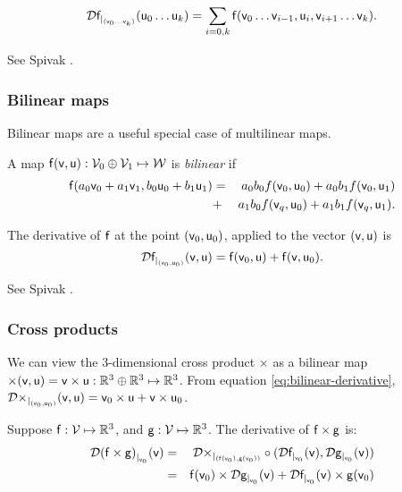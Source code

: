 \begin{equation}
\Dc{\f}{(\v_0 \ldots \v_k)}{\u_0 \ldots \u_k}
 =  \sum_{i=0,k} \f(\v_0 \ldots \v_{i-1},\u_i,\v_{i+1} \ldots \v_k).
\end{equation}

See Spivak \cite[ex.~2-14]{spivak-1965}.



\subsubsection{Bilinear maps}
\label{sec:Bilinear-maps}

Bilinear maps are a useful special case of multilinear maps.

A map $\f(\v,\u):\Vspace_0 \oplus \Vspace_1 \mapsto \Wspace$
is {\it bilinear} if
\begin{eqnarray}
\f(a_0 \v_0 + a_1 \v_1, b_0 \u_0 + b_1 \u_1)
& =  & a_0 b_0 f(\v_0,\u_0)
+  a_0 b_1 f(\v_0,\u_1)
\\
& +  & a_1 b_0 f(\v_q,\u_0)
 +  a_1 b_1 f(\v_q,\u_1).
\nonumber
\end{eqnarray}

The derivative of $\f$
at the point $(\v_0,\u_0)$, applied to the vector $(\v,\u)$ is
\begin{equation}
\label{eq:bilinear-derivative}
\Dc{\f}{(\v_0,\u_0)}{\v,\u} = \f(\v_0,\u) + \f(\v,\u_0).
\end{equation}

See Spivak \cite[ex.~2-12]{spivak-1965}.



\subsubsection{Cross products}
\label{sec:Derivatives-of-cross-products}

We can view the 3-dimensional cross product
$ \times $
as a bilinear map
$\times(\v,\u) = \v \times \u : \Reals^3 \oplus \Reals^3 \mapsto \Reals^3$.
From equation \ref{eq:bilinear-derivative},
$\Dc{\times}{(\v_0,\u_0)}{\v,\u} = \v_0 \times \u + \v \times \u_0$.

Suppose
$\f:\Vspace \mapsto \Reals^3$, and
$\g:\Vspace \mapsto \Reals^3$.
The derivative of $\f \times \g$ is:
\begin{eqnarray}
\Dc{(\f \times \g)}{\v_0}{\v}
& =
& \Db{\times}{(\f(\v_0),\g(\v_0))} \circ (\Dc{\f}{\v_0}{\v}, \Dc{\g}{\v_0}{\v})
\\
& =
& \f(\v_0) \times \Dc{\g}{\v_0}{\v} + \Dc{\f}{\v_0}{\v} \times \g(\v_0) \nonumber
\end{eqnarray}

